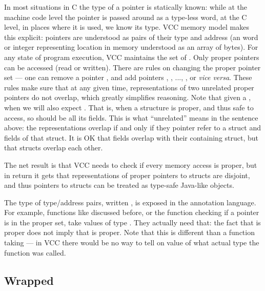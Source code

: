 In most situations in C the type of a pointer is statically known:
while at the machine code level the pointer is passed around as a type-less
word, at the C level, in places where it is used, we know its type.
VCC memory model makes this explicit: pointers are understood as pairs
of their type and address (an word or integer representing location in memory
understood as an array of bytes).
For any state of program execution, VCC maintains the set of .
Only proper pointers can be accessed (read or written).
There are rules on changing the proper pointer set --- \eg one can remove
a pointer , and add pointers , ,
..., , or \emph{vice versa}.
These rules make sure that at any given time, representations of two
unrelated proper pointers do not overlap, which greatly simplifies reasoning.
Note that given a , when 
we will also expect .
That is, when a structure is proper, and thus safe to access, so should
be all its fields.
This is what ``unrelated'' means in the sentence above:
the representations overlap if and only if they pointer refer to a struct
and fields of that struct.
It is OK that fields overlap with their containing struct, but that
structs overlap each other.

The net result is that VCC needs to check if every memory access is proper,
but in return it gets that representations of proper pointers to structs
are disjoint, and thus pointers to structs can be treated as type-safe
Java-like objects.

The type of type/address pairs, written \vcc{\object}, is exposed in the annotation
language.
For example, functions like  discussed before,
or the function \vcc{\proper()} checking if a pointer is in the proper set,
take values of type \vcc{\object}.
They actually need that:
the fact that  is proper
does not imply that  is proper.
Note that this is different than a function taking  --- in
VCC there would be no way to tell on value of what actual type the function was called.

\subsection{Wrapped}

